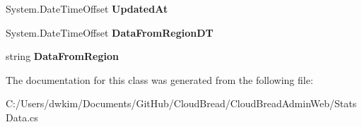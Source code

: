 \begin{DoxyCompactItemize}
\item 
System.\+Date\+Time\+Offset {\bfseries Updated\+At}\hypertarget{class_cloud_bread_admin_web_1_1_stats_data_a177dfb28b3b8f3d9dadb2c502a67be23}{}\label{class_cloud_bread_admin_web_1_1_stats_data_a177dfb28b3b8f3d9dadb2c502a67be23}

\item 
System.\+Date\+Time\+Offset {\bfseries Data\+From\+Region\+DT}\hypertarget{class_cloud_bread_admin_web_1_1_stats_data_a3c32fd9aa019ed87b1f6b7af163bd628}{}\label{class_cloud_bread_admin_web_1_1_stats_data_a3c32fd9aa019ed87b1f6b7af163bd628}

\item 
string {\bfseries Data\+From\+Region}\hypertarget{class_cloud_bread_admin_web_1_1_stats_data_abb1cc8a7569238467e853d98fa9aeb86}{}\label{class_cloud_bread_admin_web_1_1_stats_data_abb1cc8a7569238467e853d98fa9aeb86}

\end{DoxyCompactItemize}


The documentation for this class was generated from the following file\+:\begin{DoxyCompactItemize}
\item 
C\+:/\+Users/dwkim/\+Documents/\+Git\+Hub/\+Cloud\+Bread/\+Cloud\+Bread\+Admin\+Web/Stats\+Data.\+cs\end{DoxyCompactItemize}
